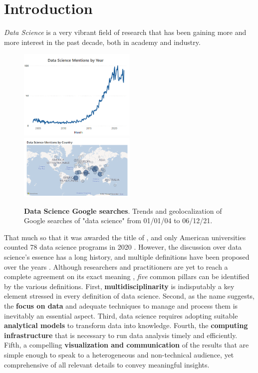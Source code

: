 \chapter{Introduction}
\label{chap:introduction}


\emph{Data Science} is a very vibrant field of research that has been gaining more and more interest in the past decade, both in academy and industry. 
\begin{figure}
\centerline{
\includegraphics[width=0.5\textwidth]{figures/DataScience/trend_ds.png}
\includegraphics[width=0.5\textwidth]{figures/DataScience/map_ds.png}
}
\caption{
\textbf{Data Science Google searches}. Trends and geolocalization of Google searches of "data science" from 01/01/04 to 06/12/21.
} 
\label{fig:GoogleTrendsDS}
\end{figure}
That much so that it was awarded the title of  \cite{davenport2012sexiest}, and only American universities counted 78 data science programs in 2020 \cite{zhang2021data}.
However, the discussion over data science's essence has a long history, and multiple definitions have been proposed over the years \cite{donoho201750years}.
Although researchers and practitioners are yet to reach a complete agreement on its exact meaning  \cite{ASA2015statement}, \emph{five} common pillars can be identified by the various definitions.
First, \textbf{multidisciplinarity} is indisputably a key element stressed in every definition of data science. 
Second, as the name suggests, the \textbf{focus on data} and adequate techniques to manage and process them is inevitably an essential aspect.
Third, data science requires adopting suitable \textbf{analytical models} to transform data into knowledge.
Fourth, the \textbf{computing infrastructure} that is necessary to run data analysis timely and efficiently. 
Fifth, a compelling \textbf{visualization and communication} of the results that are simple enough to speak to a heterogeneous and non-technical audience, yet comprehensive of all relevant details to convey meaningful insights.

